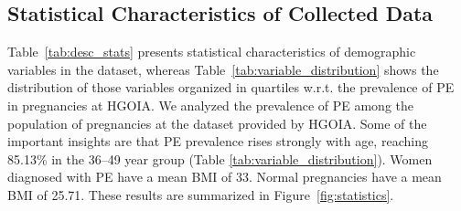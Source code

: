 \documentclass[diagnostics,article,accept,pdftex,moreauthors]{Definitions/mdpi}
\begin{document}
\subsection{Statistical Characteristics of Collected Data}
\label{sec:stat-char-data}

{Table}~\ref{tab:desc_stats} presents
statistical characteristics of demographic variables in the dataset,
whereas Table~\ref{tab:variable_distribution} shows the distribution
of those variables organized in quartiles \ac{w.r.t.} the
prevalence of \ac{PE} in pregnancies at \ac{HGOIA}. {We analyzed the prevalence of} \ac{PE} among the population
of pregnancies at the dataset provided by \ac{HGOIA}. Some
of the important insights are that \ac{PE} prevalence rises strongly
with age, reaching 85.13\% in the 36--49 year group
({Table} %
 \ref{tab:variable_distribution}). Women diagnosed
with \ac{PE} have a mean \ac{BMI} of 33. Normal pregnancies
have a mean \ac{BMI} of 25.71. These results are summarized in
Figure~\ref{fig:statistics}. 
\end{document}
